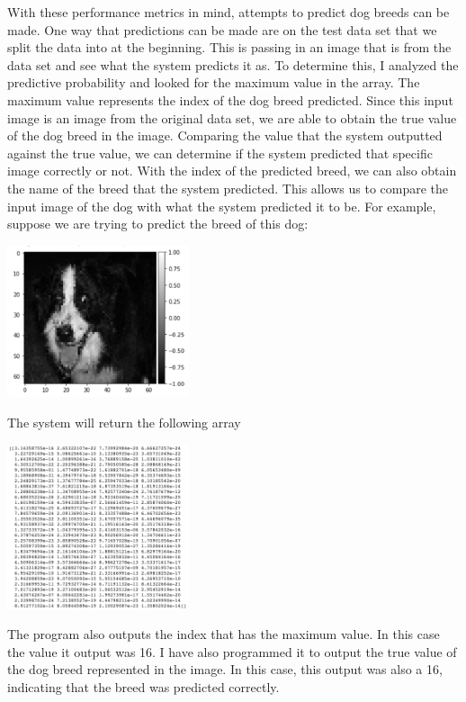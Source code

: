 \documentclass[12pt]{article}
\begin{document}
With these performance metrics in mind, attempts to predict dog breeds can be made.  One way that predictions can be made are on the test data set that we split the data into at the beginning.  This is passing in an image that is from the data set and see what the system predicts it as.  To determine this, I analyzed the predictive probability and looked for the maximum value in the array.  The maximum value represents the index of the dog breed predicted.  Since this input image is an image from the original data set, we are able to obtain the true value of the dog breed in the image.  Comparing the value that the system outputted against the true value, we can determine if the system predicted that specific image correctly or not.  With the index of the predicted breed, we can also obtain the name of the breed that the system predicted.  This allows us to compare the input image of the dog with what the system predicted it to be.  For example, suppose we are trying to predict the breed of this dog:
\begin{center}
    \includegraphics[width=0.4\textwidth]{predictDog.jpg}
\end{center}
The system will return the following array
\begin{center}
    \includegraphics[width=0.4\textwidth]{output.jpg}
\end{center}
The program also outputs the index that has the maximum value.  In this case the value it output was 16.  I have also programmed it to output the true value of the dog breed represented in the image.  In this case, this output was also a 16, indicating that the breed was predicted correctly.
\end{document}
